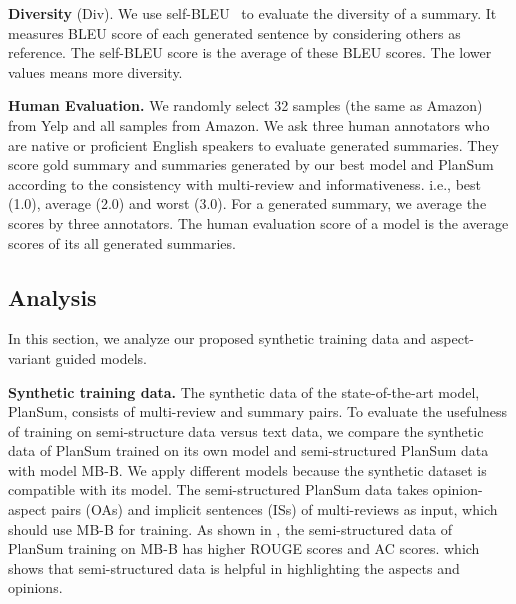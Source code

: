 \textbf{Diversity} (Div).
We use self-BLEU~\cite{SelfBleu18} to evaluate the diversity of a summary. 
It measures BLEU score of each generated sentence by considering others as reference. The self-BLEU score is the average of these BLEU scores.
The lower values means more diversity.

\textbf{Human Evaluation.}
We randomly select 32 samples (the same as Amazon) from Yelp and all samples from Amazon.
We ask three human annotators
who are 
native or proficient English speakers to evaluate generated summaries.
They score gold summary and summaries 
generated by our best model and 
PlanSum according to the consistency with multi-review and informativeness.
i.e., best (1.0), average (2.0) and worst (3.0).
For a generated summary, we average the scores by
three annotators.
The human evaluation score of a model is the average scores of its all generated summaries.


\subsection{Analysis}
\label{sec:results}
In this section, we analyze our proposed synthetic training data  and 
aspect-variant guided models.


\textbf{Synthetic training data.}
The synthetic data of the state-of-the-art model, PlanSum,
consists of multi-review and summary pairs.
To evaluate the usefulness of training on semi-structure data
versus text data,
we compare the synthetic data of PlanSum trained on its own model and
semi-structured PlanSum data with model MB-B.
We apply different models because
the synthetic dataset is compatible with its model.
The semi-structured PlanSum data
takes opinion-aspect pairs (OAs) and implicit sentences (ISs)
of multi-reviews as input, which should use MB-B for training.
As shown in , 
the semi-structured data of PlanSum training on MB-B
has higher ROUGE scores and AC scores.
which shows that semi-structured data
is helpful in highlighting the aspects and opinions.

